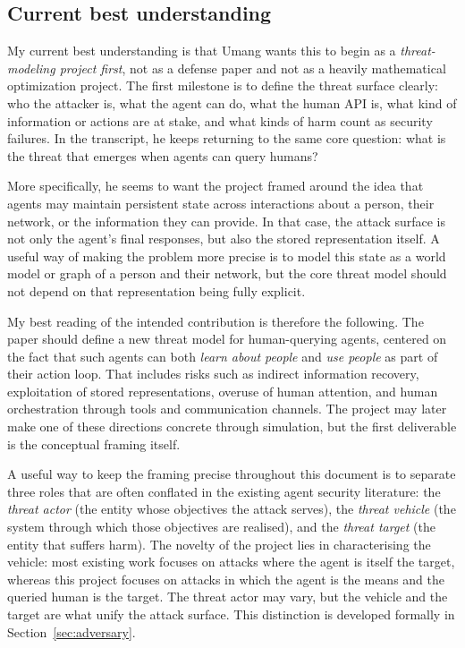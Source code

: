 \documentclass[11pt]{article}
\begin{document}
\subsection{Current best understanding}

My current best understanding is that Umang wants this to begin as a \emph{threat-modeling project first}, not as a defense paper and not as a heavily mathematical optimization project. The first milestone is to define the threat surface clearly: who the attacker is, what the agent can do, what the human API is, what kind of information or actions are at stake, and what kinds of harm count as security failures. In the transcript, he keeps returning to the same core question: what is the threat that emerges when agents can query humans?

More specifically, he seems to want the project framed around the idea that agents may maintain persistent state across interactions about a person, their network, or the information they can provide. In that case, the attack surface is not only the agent's final responses, but also the stored representation itself. A useful way of making the problem more precise is to model this state as a world model or graph of a person and their network, but the core threat model should not depend on that representation being fully explicit.

My best reading of the intended contribution is therefore the following. The paper should define a new threat model for human-querying agents, centered on the fact that such agents can both \emph{learn about people} and \emph{use people} as part of their action loop. That includes risks such as indirect information recovery, exploitation of stored representations, overuse of human attention, and human orchestration through tools and communication channels. The project may later make one of these directions concrete through simulation, but the first deliverable is the conceptual framing itself.

A useful way to keep the framing precise throughout this document is to separate three roles that are often conflated in the existing agent security literature: the \emph{threat actor} (the entity whose objectives the attack serves), the \emph{threat vehicle} (the system through which those objectives are realised), and the \emph{threat target} (the entity that suffers harm). The novelty of the project lies in characterising the vehicle: most existing work focuses on attacks where the agent is itself the target, whereas this project focuses on attacks in which the agent is the means and the queried human is the target. The threat actor may vary, but the vehicle and the target are what unify the attack surface. This distinction is developed formally in Section~\ref{sec:adversary}.
\end{document}
